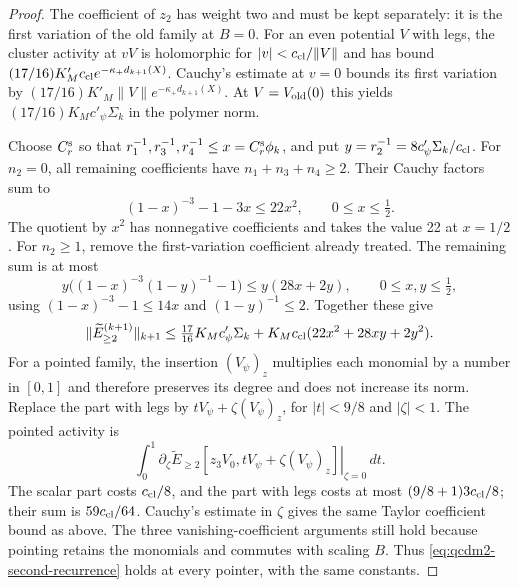 \documentclass[11pt,letterpaper,reqno]{amsart}
\theoremstyle{definition}
\theoremstyle{remark}
\begin{document}
\begin{proof}
The coefficient of $z_2$ has weight two and must be
kept separately: it is the first variation of the old
family at $B=0$.  For an even potential $V$ with legs,
the cluster activity at $vV$ is holomorphic for
$|v|<c_{\rm cl}/\|V\|$ and has bound
$(17/16)K'_Mc_{\rm cl}e^{-\kappa_+d_{k+1}(X)}$.
Cauchy's estimate at $v=0$ bounds its first variation
by $(17/16)K'_M\|V\|e^{-\kappa_+d_{k+1}(X)}$.
At $V=V_{\rm old}(0)$ this yields
$(17/16)K_Mc'_\psi\Sigma_k$ in the polymer norm.

Choose $C_r^{\rm s}$ so that
$r_1^{-1},r_3^{-1},r_4^{-1}\le x=C_r^{\rm s}\phi_k$, and put
$y=r_2^{-1}=8c'_\psi\Sigma_k/c_{\rm cl}$.
For $n_2=0$, all remaining coefficients have
$n_1+n_3+n_4\ge2$.  Their Cauchy factors sum to
\[
 (1-x)^{-3}-1-3x\le22x^2,\qquad 0\le x\le\tfrac12.
\]
The quotient by $x^2$ has nonnegative coefficients and
takes the value 22 at $x=1/2$.  For $n_2\ge1$, remove
the first-variation coefficient already treated.
The remaining sum is at most
\[
 y\bigl((1-x)^{-3}(1-y)^{-1}-1\bigr)
       \le y(28x+2y),\qquad 0\le x,y\le\tfrac12,
\]
using $(1-x)^{-3}-1\le14x$ and $(1-y)^{-1}\le2$.
Together these give
\begin{equation}\label{eq:qcdm2-second-recurrence}
 \|\widetilde E_{\ge2}^{(k+1)}\|_{k+1}
 \le\tfrac{17}{16}K_Mc'_\psi\Sigma_k
       +K_Mc_{\rm cl}(22x^2+28xy+2y^2).
\end{equation}
For a pointed family, the insertion $(V_\psi)_z$
multiplies each monomial by a number in $[0,1]$ and
therefore preserves its degree and does not increase
its norm.  Replace the part with legs by
$tV_\psi+\zeta(V_\psi)_z$, for $|t|<9/8$ and
$|\zeta|<1$.  The pointed activity is
\[
 \int_0^1\left.\partial_\zeta
    \widetilde E_{\ge2}[z_3V_0,tV_\psi+\zeta(V_\psi)_z]
                                      \right|_{\zeta=0}\,dt.
\]
The scalar part costs $c_{\rm cl}/8$, and the part with
legs costs at most $(9/8+1)3c_{\rm cl}/8$; their sum is
$59c_{\rm cl}/64$.  Cauchy's estimate in $\zeta$ gives
the same Taylor coefficient bound as above.  The three
vanishing-coefficient arguments still hold because
pointing retains the monomials and commutes with scaling
$B$.  Thus \eqref{eq:qcdm2-second-recurrence} holds at
every pointer, with the same constants.


\end{proof}
\end{document}
